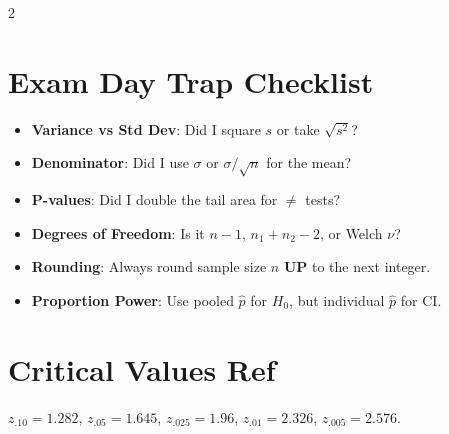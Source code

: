 \documentclass[10pt]{article}
\begin{document}
\begin{multicols}{2}
\section*{Exam Day Trap Checklist}
\begin{itemize}
    \item \textbf{Variance vs Std Dev}: Did I square $s$ or take $\sqrt{s^2}$?
    \item \textbf{Denominator}: Did I use $\sigma$ or $\sigma/\sqrt{n}$ for the mean?
    \item \textbf{P-values}: Did I double the tail area for $\neq$ tests?
    \item \textbf{Degrees of Freedom}: Is it $n-1$, $n_1+n_2-2$, or Welch $\nu$?
    \item \textbf{Rounding}: Always round sample size $n$ \textbf{UP} to the next integer.
    \item \textbf{Proportion Power}: Use pooled $\hat{p}$ for $H_0$, but individual $\hat{p}$ for CI.
\end{itemize}

\section*{Critical Values Ref}
$z_{.10}=1.282$, $z_{.05}=1.645$, $z_{.025}=1.96$, $z_{.01}=2.326$, $z_{.005}=2.576$.

\end{multicols}

\vfill
\begin{center}
\end{center}
\end{document}
